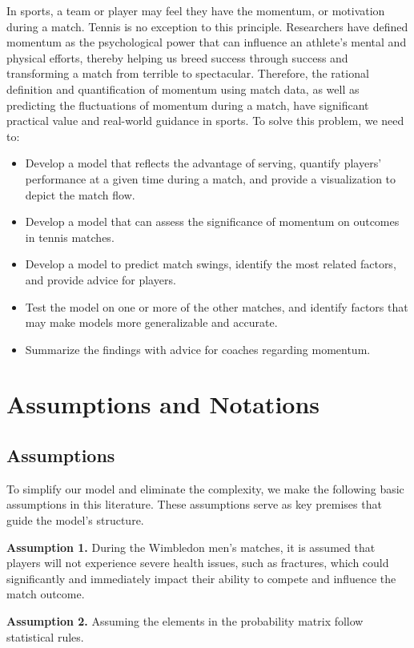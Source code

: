\documentclass{mcmthesis}
\begin{document}
In sports, a team or player may feel they have the momentum, or motivation during a match. Tennis is no exception to this principle. Researchers have defined momentum as the psychological power that can influence an athlete's mental and physical efforts, thereby helping us breed success through success and transforming a match from terrible to spectacular\cite{1}. Therefore, the rational definition and quantification of momentum using match data, as well as predicting the fluctuations of momentum during a match, have significant practical value and real-world guidance in sports.
To solve this problem, we need to:
\begin{itemize}
	\item Develop a model that reflects the advantage of serving, quantify players' performance at a given time during a match, and provide a visualization to depict the match flow.
	\item Develop a model that can assess the significance of momentum on outcomes in tennis matches.
	\item Develop a model to predict match swings, identify the most related factors, and provide advice for players.
	\item Test the model on one or more of the other matches, and identify factors that may make models more generalizable and accurate.
	\item Summarize the findings with advice for coaches regarding momentum.
\end{itemize}

\section{Assumptions and Notations}
\subsection{Assumptions}

To simplify our model and eliminate the complexity, we make the following basic assumptions in this literature. These assumptions serve as key premises that guide the model's structure.

\noindent\textbf{Assumption 1.} During the Wimbledon men's matches, it is assumed that players will not experience severe health issues, such as fractures, which could significantly and immediately impact their ability to compete and influence the match outcome.
	
\noindent\textbf{Assumption 2.} Assuming the elements in the probability matrix follow statistical rules.
\end{document}
